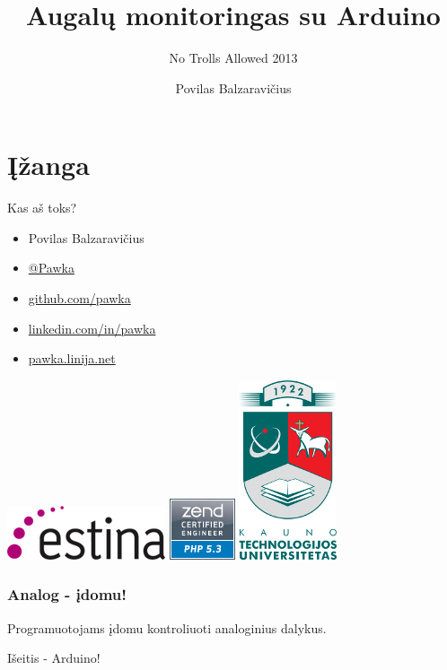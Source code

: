 \documentclass[12pt,a4paper]{beamer}
\author{Povilas Balzaravičius}
\title{Augalų monitoringas su Arduino}
\subtitle{No Trolls Allowed 2013}
\begin{document}
\section{Įžanga}
\begin{frame}
	\titlepage
\end{frame}

\begin{frame}{Kas aš toks?}
    \begin{itemize}
        \item Povilas Balzaravičius
        \item \href{https://twitter.com/pawka}{@Pawka}
        \item \href{https://github.com/pawka}{github.com/pawka}
        \item \href{https://linkedin.com/in/pawka}{linkedin.com/in/pawka}
        \item \href{http://pawka.linija.net}{pawka.linija.net}
    \end{itemize}
    \begin{center}
        \includegraphics[scale=0.4]{img/estina.png}
        \hskip1.5cm
        \includegraphics[scale=0.4]{img/zce.png}
        \hskip1.5cm
        \includegraphics[scale=0.75]{img/ktu.png}
    \end{center}
\end{frame}

\begin{frame}
    \frametitle{Analog - įdomu!}

    \begin{center}
        Programuotojams įdomu kontroliuoti analoginius dalykus.
    \end{center}
    \pause
    \begin{center}
        {\Huge Išeitis - Arduino!}
    \end{center}

\end{frame}
\end{document}
